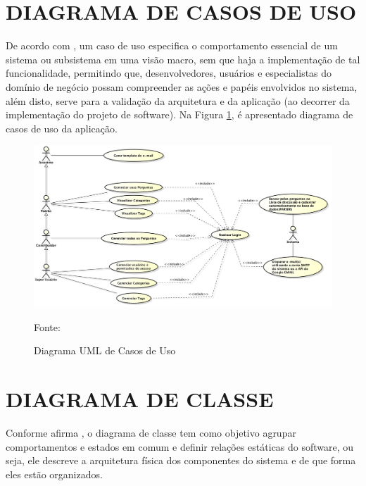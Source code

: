 \section{DIAGRAMA DE CASOS DE USO}

De acordo com , um caso de uso especifica o
comportamento essencial de um sistema ou subsistema em uma visão macro, sem que
haja a implementação de tal funcionalidade, permitindo que, desenvolvedores, 
usuários e especialistas do domínio de negócio possam compreender as ações e 
papéis envolvidos no sistema, além disto, serve para a validação da arquitetura 
e da aplicação (ao decorrer da implementação do projeto de software). Na Figura
\ref{fig:diagramaCasosDeUso}, é apresentado diagrama de casos de uso da aplicação.

\begin{figure}[h!tb]
	\caption{Diagrama UML de Casos de Uso}
	\label{fig:diagramaCasosDeUso}

	\centering
	\includegraphics[width=\textwidth]{images/usecase.png}

	\centering
	\footnotesize Fonte: \fonteOAutor
\end{figure}

\FloatBarrier 	%

\section{DIAGRAMA DE CLASSE}

Conforme afirma , o diagrama de 
classe tem como objetivo agrupar comportamentos e estados em comum e definir 
relações estáticas do software, ou seja, ele descreve a arquitetura física dos 
componentes do sistema e de que forma eles estão organizados.

